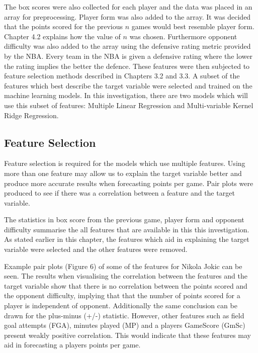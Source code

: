 \documentclass[a4paper,11pt,twoside]{article}
\begin{document}
The box scores were also collected for each player and the data was placed in an array for preprocessing.  Player form was also added to the array. It was decided that the points scored for the previous $n$ games would best resemble player form. Chapter 4.2 explains how the value of $n$ was chosen. Furthermore opponent difficulty was also added to the array using the defensive rating metric provided by the NBA. Every team in the NBA is given a defensive rating where the lower the rating implies the better the defence. These features were then subjected to feature selection methods described in Chapters 3.2 and 3.3. A subset of the features which best describe the target variable were selected and trained on the machine learning models. In this investigation, there are two models which will use this subset of features: Multiple Linear Regression and Multi-variable Kernel Ridge Regression.


\subsection{Feature Selection}

Feature selection is required for the models which use multiple features. Using more than one feature may allow us to explain the target variable better and produce more accurate results when forecasting points per game.  Pair plots  were produced to see if there was a correlation between a feature and the target variable. 

The statistics in box score from the previous game, player form and opponent difficulty summarise the all features that are available in this this investigation. As stated earlier in this chapter,  the features which aid in explaining the target variable were selected and the other features were removed.

Example pair plots (Figure 6) of some of the features for Nikola Jokic can be seen. The results when visualising the correlation between the features and the target variable show that there is no correlation between the points scored and the opponent difficulty, implying that that the number of points scored for a player is independent of opponent. Additionally the same conclusion can be drawn for the plus-minus (+/-) statistic. However, other features such as field goal attempts (FGA), minutes played (MP) and a players GameScore (GmSc) present weakly positive correlation. This would indicate that these features may aid in forecasting a players points per game. 
\end{document}

